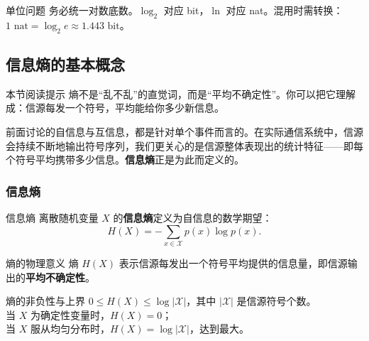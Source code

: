 \begin{warningBox}{单位问题}
务必统一对数底数。$\log_2$ 对应 bit，$\ln$ 对应 nat。混用时需转换：$1\text{ nat}= \log_2 e\approx 1.443\text{ bit}$。
\end{warningBox}

\subsection{信息熵的基本概念}

\begin{remarkBox}{本节阅读提示}
熵不是“乱不乱”的直觉词，而是“平均不确定性”。你可以把它理解成：信源每发一个符号，平均能给你多少新信息。
\end{remarkBox}

前面讨论的自信息与互信息，都是针对单个事件而言的。在实际通信系统中，信源会持续不断地输出符号序列，我们更关心的是信源整体表现出的统计特征——即每个符号平均携带多少信息。\textbf{信息熵}正是为此而定义的。

\subsubsection{信息熵}
\begin{definitionBox}{信息熵}
离散随机变量 $X$ 的\textbf{信息熵}定义为自信息的数学期望：
\[
H(X) = -\sum_{x \in \mathcal{X}} p(x) \log p(x).
\]
\end{definitionBox}

\begin{keypoint}{熵的物理意义}
熵 $H(X)$ 表示信源每发出一个符号平均提供的信息量，即信源输出的\textbf{平均不确定性}。
\end{keypoint}

\begin{theoremBox}{熵的非负性与上界}
$0 \le H(X) \le \log |\mathcal{X}|$，其中 $|\mathcal{X}|$ 是信源符号个数。\\
当 $X$ 为确定性变量时，$H(X)=0$；\\
当 $X$ 服从均匀分布时，$H(X)=\log|\mathcal{X}|$，达到最大。
\end{theoremBox}


